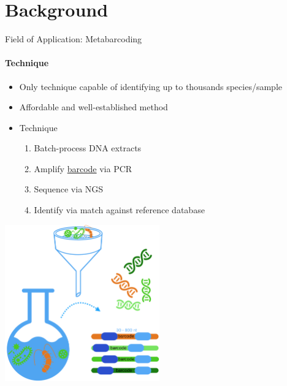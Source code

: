 \documentclass[xcolor=dvipsnames,envcountsect]{beamer}
\begin{document}
\section{Background}
\begin{frame}{Field of Application: Metabarcoding}\framesubtitle{Technique}
\begin{multicols}{2}
\begin{itemize}
    \item Only technique capable of identifying up to thousands species/sample
    \item Affordable and well-established method %
    \item Technique
    \begin{enumerate}
        \item Batch-process DNA extracts
        \item Amplify \underline{barcode} via PCR %
        \item Sequence via NGS %
        \item Identify via match against reference database
    \end{enumerate}
\end{itemize}
    \begin{center}
        \includegraphics[width=0.5\textwidth]{picto_metabarcoding}
    \end{center}
\end{multicols}
\end{frame}

    
\end{document}
